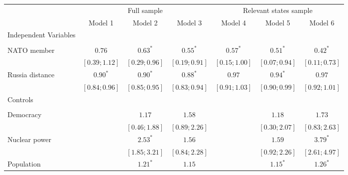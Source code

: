 
\begin{table}[h!]
\begin{center}
\begin{tabular}{l c c c c c c}
\hline
 & \multicolumn{3}{c}{Full sample} & \multicolumn{3}{c}{Relevant states sample} \\
\cline{2-4} \cline{5-7}
 & Model 1 & Model 2 & Model 3 & Model 4 & Model 5 & Model 6 \\
\hline
Independent Variables &                 &                 &                 &                 &                 &                 \\
                      &                 &                 &                 &                 &                 &                 \\
\quad NATO member     & $0.76$          & $0.63^{*}$      & $0.55^{*}$      & $0.57^{*}$      & $0.51^{*}$      & $0.42^{*}$      \\
                      & $ [0.39; 1.12]$ & $ [0.29; 0.96]$ & $ [0.19; 0.91]$ & $ [0.15; 1.00]$ & $ [0.07; 0.94]$ & $ [0.11; 0.73]$ \\
\quad Russia distance & $0.90^{*}$      & $0.90^{*}$      & $0.88^{*}$      & $0.97$          & $0.94^{*}$      & $0.97$          \\
                      & $ [0.84; 0.96]$ & $ [0.85; 0.95]$ & $ [0.83; 0.94]$ & $ [0.91; 1.03]$ & $ [0.90; 0.99]$ & $ [0.92; 1.01]$ \\
Controls              &                 &                 &                 &                 &                 &                 \\
                      &                 &                 &                 &                 &                 &                 \\
\quad Democracy       &                 & $1.17$          & $1.58$          &                 & $1.18$          & $1.73$          \\
                      &                 & $ [0.46; 1.88]$ & $ [0.89; 2.26]$ &                 & $ [0.30; 2.07]$ & $ [0.83; 2.63]$ \\
\quad Nuclear power   &                 & $2.53^{*}$      & $1.56$          &                 & $1.59$          & $3.79^{*}$      \\
                      &                 & $ [1.85; 3.21]$ & $ [0.84; 2.28]$ &                 & $ [0.92; 2.26]$ & $ [2.61; 4.97]$ \\
\quad Population      &                 & $1.21^{*}$      & $1.15$          &                 & $1.15^{*}$      & $1.26^{*}$      \\

\end{tabular}
\end{center}
\end{table}
